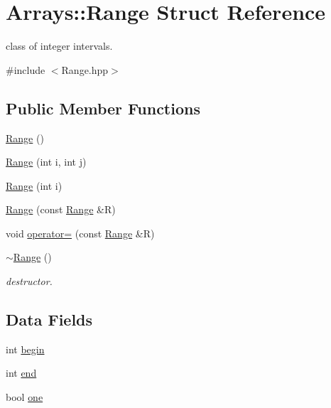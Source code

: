 \hypertarget{structArrays_1_1Range}{}\section{Arrays\+:\+:Range Struct Reference}
\label{structArrays_1_1Range}


class of integer intervals.  




{\ttfamily \#include $<$Range.\+hpp$>$}

\subsection*{Public Member Functions}
\begin{DoxyCompactItemize}
\item 
\hyperlink{structArrays_1_1Range_a3c5e646120d312532ef22532a064abd6}{Range} ()
\item 
\hyperlink{structArrays_1_1Range_ad3d26cfd5d0423e99668676da950ca47}{Range} (int i, int j)
\item 
\hyperlink{structArrays_1_1Range_a691f17f9cb7c38e3c4a57282d50937ef}{Range} (int i)
\item 
\hyperlink{structArrays_1_1Range_acff35093ebad2e5029f1a6aa98178adc}{Range} (const \hyperlink{structArrays_1_1Range}{Range} \&R)
\item 
void \hyperlink{structArrays_1_1Range_a1d0111bea2cf919e51ac45a514da9d19}{operator=} (const \hyperlink{structArrays_1_1Range}{Range} \&R)
\item 
\hyperlink{structArrays_1_1Range_a35b9170092007398682de9c792ee8b33}{$\sim$\+Range} ()
\begin{DoxyCompactList}\small\item\em destructor. \end{DoxyCompactList}\end{DoxyCompactItemize}
\subsection*{Data Fields}
\begin{DoxyCompactItemize}
\item 
int \hyperlink{structArrays_1_1Range_af70365880c8fdf224610c238f80416a1}{begin}
\item 
int \hyperlink{structArrays_1_1Range_a0f4a13c3bae7fa1f7c821eb480a1567b}{end}
\item 
bool \hyperlink{structArrays_1_1Range_af99a8a7edd7b78e0ce342ed13b248dcf}{one}
\end{DoxyCompactItemize}


